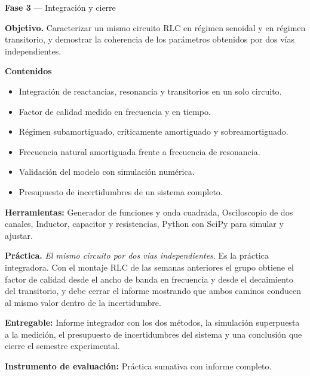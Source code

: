 \documentclass[11pt,a4paper]{article}
\begin{document}
\begin{tcolorbox}[cajaContenido,title={Semana 9 --- Práctica integradora, caracterización completa de un circuito RLC}]
\textbf{Fase 3} --- Integración y cierre

\textbf{Objetivo.} Caracterizar un mismo circuito RLC en régimen senoidal y en régimen transitorio, y demostrar la coherencia de los parámetros obtenidos por dos vías independientes.

\textbf{Contenidos}

\begin{itemize}[leftmargin=1.4em,itemsep=2pt,topsep=3pt]
  \item Integración de reactancias, resonancia y transitorios en un solo circuito.
  \item Factor de calidad medido en frecuencia y en tiempo.
  \item Régimen subamortiguado, críticamente amortiguado y sobreamortiguado.
  \item Frecuencia natural amortiguada frente a frecuencia de resonancia.
  \item Validación del modelo con simulación numérica.
  \item Presupuesto de incertidumbres de un sistema completo.
\end{itemize}

\textbf{Herramientas:} Generador de funciones y onda cuadrada, Osciloscopio de dos canales, Inductor, capacitor y resistencias, Python con SciPy para simular y ajustar.

\textbf{Práctica.} \emph{El mismo circuito por dos vías independientes}. Es la práctica integradora. Con el montaje RLC de las semanas anteriores el grupo obtiene el factor de calidad desde el ancho de banda en frecuencia y desde el decaimiento del transitorio, y debe cerrar el informe mostrando que ambos caminos conducen al mismo valor dentro de la incertidumbre.

\textbf{Entregable:} Informe integrador con los dos métodos, la simulación superpuesta a la medición, el presupuesto de incertidumbres del sistema y una conclusión que cierre el semestre experimental.

\textbf{Instrumento de evaluación:} Práctica sumativa con informe completo.
\end{tcolorbox}
\end{document}
